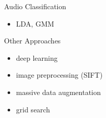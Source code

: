 \documentclass{beamer}
\begin{document}
\begin{frame}{Audio Classification}
    \begin{itemize}
        \item LDA, GMM
    \end{itemize}
\end{frame}

\begin{frame}{Other Approaches}
    \begin{itemize}
        \item deep learning
        \item image preprocessing (SIFT)
        \item massive data augmentation
        \item grid search
    \end{itemize}
\end{frame}
\end{document}
